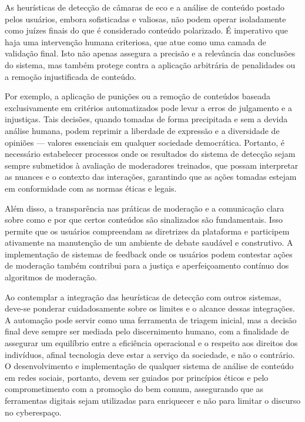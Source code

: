 As heurísticas de detecção de câmaras de eco e a análise de conteúdo postado pelos usuários, embora sofisticadas e valiosas, não podem operar isoladamente como juízes finais do que é considerado conteúdo polarizado. É imperativo que haja uma intervenção humana criteriosa, que atue como uma camada de validação final. Isto não apenas assegura a precisão e a relevância das conclusões do sistema, mas também protege contra a aplicação arbitrária de penalidades ou a remoção injustificada de conteúdo.

Por exemplo, a aplicação de punições ou a remoção de conteúdos baseada exclusivamente em critérios automatizados pode levar a erros de julgamento e a injustiças. Tais decisões, quando tomadas de forma precipitada e sem a devida análise humana, podem reprimir a liberdade de expressão e a diversidade de opiniões — valores essenciais em qualquer sociedade democrática. Portanto, é necessário estabelecer processos onde os resultados do sistema de detecção sejam sempre submetidos à avaliação de moderadores treinados, que possam interpretar as nuances e o contexto das interações, garantindo que as ações tomadas estejam em conformidade com as normas éticas e legais.

Além disso, a transparência nas práticas de moderação e a comunicação clara sobre como e por que certos conteúdos são sinalizados são fundamentais. Isso permite que os usuários compreendam as diretrizes da plataforma e participem ativamente na manutenção de um ambiente de debate saudável e construtivo. A implementação de sistemas de feedback onde os usuários podem contestar ações de moderação também contribui para a justiça e aperfeiçoamento contínuo dos algoritmos de moderação.

Ao contemplar a integração das heurísticas de detecção com outros sistemas, deve-se ponderar cuidadosamente sobre os limites e o alcance dessas integrações. A automação pode servir como uma ferramenta de triagem inicial, mas a decisão final deve sempre ser mediada pelo discernimento humano, com a finalidade de assegurar um equilíbrio entre a eficiência operacional e o respeito aos direitos dos indivíduos, afinal tecnologia deve estar a serviço da sociedade, e não o contrário. O desenvolvimento e implementação de qualquer sistema de análise de conteúdo em redes sociais, portanto, devem ser guiados por princípios éticos e pelo comprometimento com a promoção do bem comum, assegurando que as ferramentas digitais sejam utilizadas para enriquecer e não para limitar o discurso no cyberespaço.

